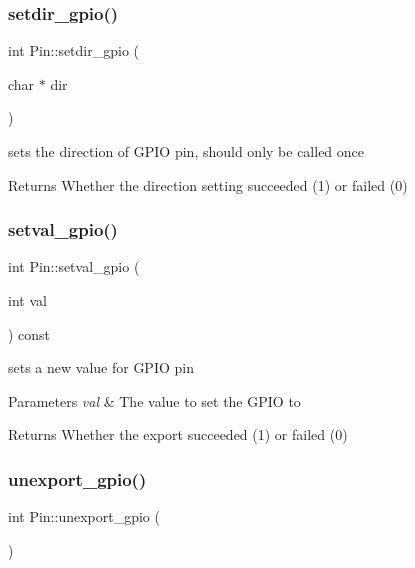 \subsubsection{\texorpdfstring{setdir\+\_\+gpio()}{setdir\_gpio()}}
{\footnotesize\ttfamily int Pin\+::setdir\+\_\+gpio (\begin{DoxyParamCaption}\item[{char $\ast$}]{dir }\end{DoxyParamCaption})}



sets the direction of G\+P\+IO pin, should only be called once 

\begin{DoxyReturn}{Returns}
Whether the direction setting succeeded (1) or failed (0) 
\end{DoxyReturn}
\mbox{\label{classPin_a319c0b85b6b667b6708fe501a47c061c}} 
\subsubsection{\texorpdfstring{setval\+\_\+gpio()}{setval\_gpio()}}
{\footnotesize\ttfamily int Pin\+::setval\+\_\+gpio (\begin{DoxyParamCaption}\item[{int}]{val }\end{DoxyParamCaption}) const}



sets a new value for G\+P\+IO pin 


\begin{DoxyParams}{Parameters}
{\em val} & The value to set the G\+P\+IO to \\
\hline
\end{DoxyParams}
\begin{DoxyReturn}{Returns}
Whether the export succeeded (1) or failed (0) 
\end{DoxyReturn}
\mbox{\label{classPin_ac0010e89c86e30b5e453f223ec591e1f}} 
\subsubsection{\texorpdfstring{unexport\+\_\+gpio()}{unexport\_gpio()}}
{\footnotesize\ttfamily int Pin\+::unexport\+\_\+gpio (\begin{DoxyParamCaption}{ }\end{DoxyParamCaption})}



